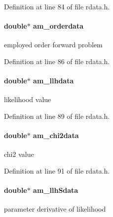 Definition at line 84 of file rdata.\+h.

\hypertarget{struct_return_data_af792e4a1c5c23c5232ef9398e25de1a7}{}
\paragraph[{am\+\_\+orderdata}]{\setlength{\rightskip}{0pt plus 5cm}double$\ast$ am\+\_\+orderdata}\label{struct_return_data_af792e4a1c5c23c5232ef9398e25de1a7}
employed order forward problem 

Definition at line 86 of file rdata.\+h.

\hypertarget{struct_return_data_af95fa143e0e524652f9a818f6288b544}{}
\paragraph[{am\+\_\+llhdata}]{\setlength{\rightskip}{0pt plus 5cm}double$\ast$ am\+\_\+llhdata}\label{struct_return_data_af95fa143e0e524652f9a818f6288b544}
likelihood value 

Definition at line 89 of file rdata.\+h.

\hypertarget{struct_return_data_ae0fc05ce8c52bdda5c7bff541c79945d}{}
\paragraph[{am\+\_\+chi2data}]{\setlength{\rightskip}{0pt plus 5cm}double$\ast$ am\+\_\+chi2data}\label{struct_return_data_ae0fc05ce8c52bdda5c7bff541c79945d}
chi2 value 

Definition at line 91 of file rdata.\+h.

\hypertarget{struct_return_data_af72a5801bf4c6b957812c8b2471ecf41}{}
\paragraph[{am\+\_\+llh\+Sdata}]{\setlength{\rightskip}{0pt plus 5cm}double$\ast$ am\+\_\+llh\+Sdata}\label{struct_return_data_af72a5801bf4c6b957812c8b2471ecf41}
parameter derivative of likelihood 

